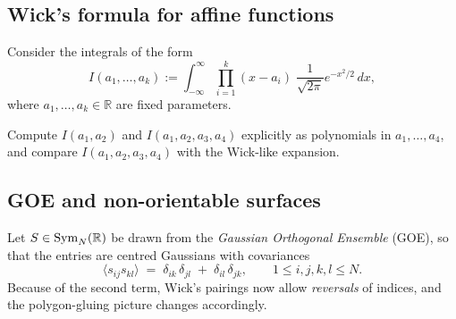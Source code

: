 \documentclass[letterpaper,11pt,oneside,reqno]{book}
\numberwithin{equation}{chapter}  %
\theoremstyle{definition}
\begin{document}
\subsection{Wick's formula for affine functions}
\label{lecture15:prob:wick-linear}
Consider the integrals of the form
\[
	I(a_1, \ldots, a_k) := \int_{-\infty}^\infty \prod_{i=1}^k (x - a_i)\; \frac{1}{\sqrt{2\pi}} e^{-x^2/2}\, dx,
\]
where $a_1, \ldots, a_k \in \mathbb{R}$ are fixed parameters.

Compute $I(a_1, a_2)$ and $I(a_1, a_2, a_3, a_4)$ explicitly as polynomials in $a_1,\ldots, a_4$,
and compare $I(a_1, a_2, a_3, a_4)$ with the Wick-like expansion.

\subsection{GOE and non-orientable surfaces}
\label{lecture15:prob:goe-nonorient}

Let $S\in\operatorname{Sym}_N(\Bbb R)$ be drawn from the \emph{Gaussian Orthogonal Ensemble} (GOE), so that the entries
are centred Gaussians with covariances
\[
  \langle s_{ij}s_{kl}\rangle
  \;=\;
  \delta_{ik}\,\delta_{jl}\;+\;\delta_{il}\,\delta_{jk},
  \qquad 1\le i,j,k,l\le N.
\]
Because of the second term, Wick’s pairings now allow \emph{reversals} of
indices, and the polygon-gluing picture changes accordingly.
\end{document}
